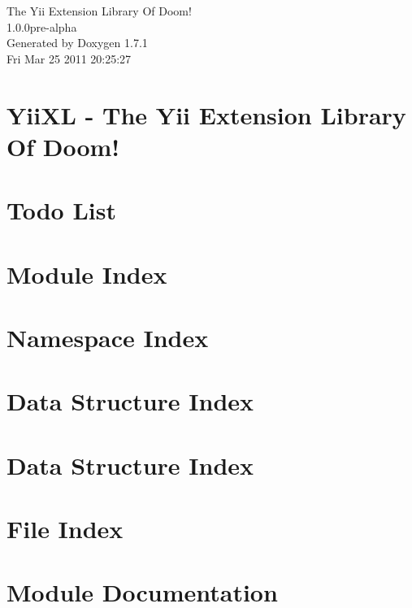 \documentclass[a4paper]{book}
\begin{document}
\hypersetup{pageanchor=false}
\begin{titlepage}
\vspace*{7cm}
\begin{center}
{\Large The Yii Extension Library Of Doom! \\[1ex]\large 1.0.0pre-\/alpha }\\
\vspace*{1cm}
{\large Generated by Doxygen 1.7.1}\\
\vspace*{0.5cm}
{\small Fri Mar 25 2011 20:25:27}\\
\end{center}
\end{titlepage}
\clearemptydoublepage
{}
\tableofcontents
\clearemptydoublepage
{}
\hypersetup{pageanchor=true}
\chapter{YiiXL -\/ The Yii Extension Library Of Doom!}
\label{index}\hypertarget{index}{}
\chapter{Todo List}
\label{todo}
\hypertarget{todo}{}

\chapter{Module Index}

\chapter{Namespace Index}

\chapter{Data Structure Index}

\chapter{Data Structure Index}

\chapter{File Index}

\chapter{Module Documentation}





\end{document}
